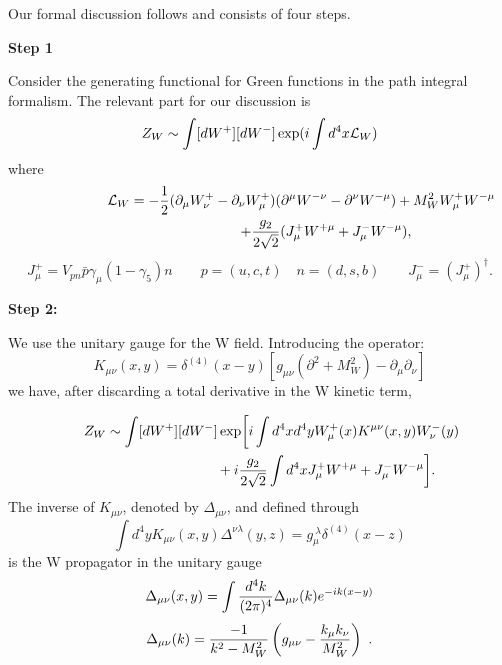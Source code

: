 \documentclass[12pt]{article}
\def\gf{\gamma_5}
\begin{document}
\begin{itemize}
\begin{itemize}
Our formal discussion follows \cite{BBL} and consists of four steps.

{\bf Step 1}

Consider
the generating functional for Green functions in the path integral
formalism. The relevant part for our discussion is
\begin{equation}\label{zw1}
Z_W\sim\int [dW^+][dW^-] \exp(i\int d^4x {\cal L}_W)  \end{equation}
where 
\begin{eqnarray}\label{lwjw}
\lefteqn{{\cal L}_W=
-{1\over 2}(\partial_\mu W^+_\nu-\partial_\nu W^+_\mu)
 (\partial^\mu W^{-\nu}-\partial^\nu W^{-\mu})+M^2_W W^+_\mu W^{-\mu}}
\hspace{3cm} \nonumber\\
& & +{g_2\over 2\sqrt{2}}(J^+_\mu W^{+\mu}+J^-_\mu W^{-\mu}),
\end{eqnarray}
\begin{equation}\label{jpn}
J^+_\mu=V_{pn} \bar p\gamma_\mu(1-\gf)n\qquad p=(u, c, t)
\quad n=(d, s, b)\qquad J^-_\mu=(J^+_\mu)^\dagger.  \end{equation}

{\bf Step 2:}

We use the unitary gauge for
the W field. 
Introducing the operator:
\begin{equation}\label{kxy}
K_{\mu\nu}(x, y)=\delta^{(4)}(x-y)\left[g_{\mu\nu}(\partial^2+
  M^2_W)-\partial_\mu\partial_\nu\right]   \end{equation}
we have, after discarding a total derivative in the W kinetic term,

\begin{eqnarray}\label{zw2}    \lefteqn{
Z_W\sim\int [dW^+][dW^-] \exp\biggl[ i\int d^4x d^4y W^+_\mu(x)
K^{\mu\nu}(x, y) W^-_\nu(y)  } \hspace{3cm}\nonumber\\
& & {}+i{g_2\over 2\sqrt{2}}\int d^4x
 J^+_\mu W^{+\mu}+J^-_\mu W^{-\mu} \biggr].
\end{eqnarray}
The inverse of $K_{\mu\nu}$, denoted by $\Delta_{\mu\nu}$, and
defined through
\begin{equation}\label{kde1}
\int d^4y K_{\mu\nu}(x, y) \Delta^{\nu\lambda}(y, z)=
 g^{\ \lambda}_\mu \delta^{(4)}(x-z)  \end{equation}
is the W propagator in the unitary gauge
\begin{equation}\label{dexy}
\Delta_{\mu\nu}(x, y)=\int{d^4k\over (2\pi)^4}\Delta_{\mu\nu}(k)
  e^{-i k(x-y)}  \end{equation}
\begin{equation}\label{dek}
\Delta_{\mu\nu}(k)={-1\over k^2-M^2_W}\left(g_{\mu\nu}-
  {k_\mu k_\nu\over M^2_W}\right)~.   \end{equation}


\end{itemize}
\end{itemize}
\end{document}
